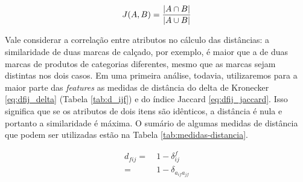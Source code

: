 \begin{equation}
\label{eq:jaccard}
J(A,B) ={{|A \cap B|}\over{|A \cup B|}}
\end{equation}

Vale considerar a correlação entre atributos no cálculo das distâncias: a similaridade de duas marcas de calçado, por exemplo, é maior que a de duas marcas de produtos de categorias diferentes, mesmo que as marcas sejam distintas nos dois casos. Em uma primeira análise, todavia, utilizaremos para a maior parte das \textit{features} as medidas de distância do delta de Kronecker \ref{eq:dfij_delta} (Tabela \ref{tab:d_ijf}) e do índice Jaccard \ref{eq:dfij_jaccard}. Isso significa que se os atributos de dois itens são idênticos, a distância é nula e portanto a similaridade é máxima. O sumário de algumas medidas de distância que podem ser utilizadas estão na Tabela \ref{tab:medidas-distancia}.

\begin{equation}
\label{eq:dfij_delta}
\begin{split}
d_{fij} =&~ 1-\delta_{ij}^f \\
    =&~ 1-\delta_{a_{if} a_{jf}}
\end{split} 
\end{equation}


